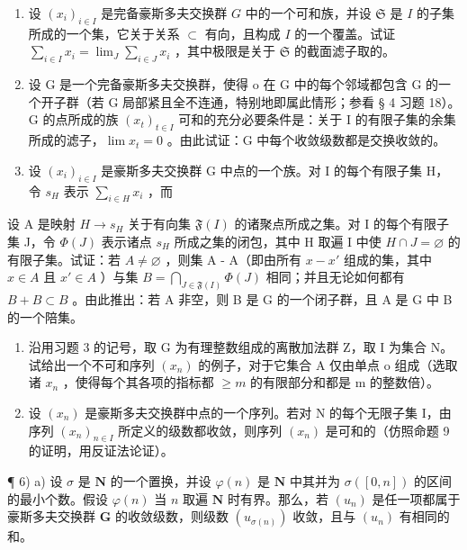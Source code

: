 \BourbakiExerciseGroup

\begin{enumerate}
\def\labelenumi{\arabic{enumi})}
\item
  设 \((x_{i})_{i\in I}\) 是完备豪斯多夫交换群 \(G\) 中的一个可和族，并设 \(\mathfrak{S}\) 是 \(I\) 的子集所成的一个集，它关于关系 \(\subset\) 有向，且构成 \(I\) 的一个覆盖。试证 \(\sum_{i\in I}x_{i} = \lim_{J}\sum_{i\in J}x_{i}\) ，其中极限是关于 \(\mathfrak{S}\) 的截面滤子取的。
\item
  设 G 是一个完备豪斯多夫交换群，使得 o 在 G 中的每个邻域都包含 G 的一个开子群（若 G 局部紧且全不连通，特别地即属此情形；参看 § 4 习题 18）。G 的点所成的族 \((x_{t})_{t\in I}\) 可和的充分必要条件是：关于 I 的有限子集的余集所成的滤子，\(\lim x_t = 0\) 。由此试证：G 中每个收敛级数都是交换收敛的。
\item
  设 \((x_{i})_{i\in I}\) 是豪斯多夫交换群 G 中点的一个族。对 I 的每个有限子集 H，令 \(s_{H}\) 表示 \(\sum_{i\in H}x_{i}\) ，而
\end{enumerate}

设 A 是映射 \(H \rightarrow s_{H}\) 关于有向集 \(\mathfrak{F}(I)\) 的诸聚点所成之集。对 I 的每个有限子集 J，令 \(\Phi(J)\) 表示诸点 \(s_{H}\) 所成之集的闭包，其中 H 取遍 I 中使 \(H \cap J = \varnothing\) 的有限子集。试证：若 \(A \neq \varnothing\) ，则集 A - A（即由所有 \(x - x'\) 组成的集，其中 \(x \in A\) 且 \(x' \in A\) ）与集 \(B = \bigcap_{J \in \mathfrak{F}(I)} \Phi(J)\) 相同；并且无论如何都有 \(B + B \subset B\) 。由此推出：若 A 非空，则 B 是 G 的一个闭子群，且 A 是 G 中 B 的一个陪集。

\begin{enumerate}
\def\labelenumi{\arabic{enumi})}
\setcounter{enumi}{3}
\item
  沿用习题 3 的记号，取 G 为有理整数组成的离散加法群 Z，取 I 为集合 N。试给出一个不可和序列 \((x_{n})\) 的例子，对于它集合 A 仅由单点 o 组成（选取诸 \(x_{n}\) ，使得每个其各项的指标都 \(\geqslant m\) 的有限部分和都是 m 的整数倍）。
\item
  设 \((x_{n})\) 是豪斯多夫交换群中点的一个序列。若对 N 的每个无限子集 I，由序列 \((x_{n})_{n\in I}\) 所定义的级数都收敛，则序列 \((x_{n})\) 是可和的（仿照命题 9 的证明，用反证法论证）。
\end{enumerate}

¶ 6) a) 设 \(\sigma\) 是 \(\mathbf{N}\) 的一个置换，并设 \(\varphi(n)\) 是 \(\mathbf{N}\) 中其并为 \(\sigma([0, n])\) 的区间的最小个数。假设 \(\varphi(n)\) 当 \(n\) 取遍 \(\mathbf{N}\) 时有界。那么，若 \((u_n)\) 是任一项都属于豪斯多夫交换群 \(\mathbf{G}\) 的收敛级数，则级数 \((u_{\sigma(n)})\) 收敛，且与 \((u_n)\) 有相同的和。

